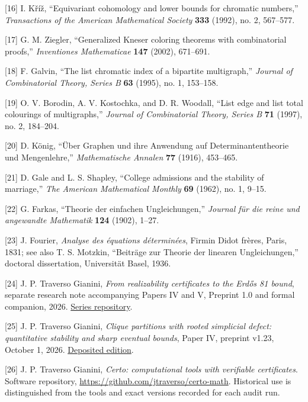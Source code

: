 \documentclass[spanish,11pt,a4paper]{article}
\begin{document}
{[}16{]} I. Kříž, ``Equivariant cohomology and lower bounds for
chromatic numbers,'' \emph{Transactions of the American Mathematical
Society} \textbf{333} (1992), no. 2, 567--577.

{[}17{]} G. M. Ziegler, ``Generalized Kneser coloring theorems with
combinatorial proofs,'' \emph{Inventiones Mathematicae} \textbf{147}
(2002), 671--691.

{[}18{]} F. Galvin, ``The list chromatic index of a bipartite
multigraph,'' \emph{Journal of Combinatorial Theory, Series B}
\textbf{63} (1995), no. 1, 153--158.

{[}19{]} O. V. Borodin, A. V. Kostochka, and D. R. Woodall, ``List edge
and list total colourings of multigraphs,'' \emph{Journal of
Combinatorial Theory, Series B} \textbf{71} (1997), no. 2, 184--204.

{[}20{]} D. König, ``Über Graphen und ihre Anwendung auf
Determinantentheorie und Mengenlehre,'' \emph{Mathematische Annalen}
\textbf{77} (1916), 453--465.

{[}21{]} D. Gale and L. S. Shapley, ``College admissions and the
stability of marriage,'' \emph{The American Mathematical Monthly}
\textbf{69} (1962), no. 1, 9--15.

{[}22{]} G. Farkas, ``Theorie der einfachen Ungleichungen,''
\emph{Journal für die reine und angewandte Mathematik} \textbf{124}
(1902), 1--27.

{[}23{]} J. Fourier, \emph{Analyse des équations déterminées}, Firmin
Didot frères, Paris, 1831; see also T. S. Motzkin, ``Beiträge zur
Theorie der linearen Ungleichungen,'' doctoral dissertation, Universität
Basel, 1936.

{[}24{]} J. P. Traverso Gianini, \emph{From realizability certificates
to the Erdős 81 bound}, separate research note accompanying Papers IV
and V, Preprint 1.0 and formal companion, 2026.
\href{https://github.com/jtraverso/erdos-81-chordal-clique-partitions}{Series
repository}.

{[}25{]} J. P. Traverso Gianini, \emph{Clique partitions with rooted
simplicial defect: quantitative stability and sharp eventual bounds},
Paper IV, preprint v1.23, October 1, 2026.
\href{https://doi.org/10.5281/zenodo.23089131}{Deposited edition}.

{[}26{]} J. P. Traverso Gianini, \emph{Certo: computational tools with
verifiable certificates}. Software repository,
\url{https://github.com/jtraverso/certo-math}. Historical use is
distinguished from the tools and exact versions recorded for each audit
run.
\end{document}
